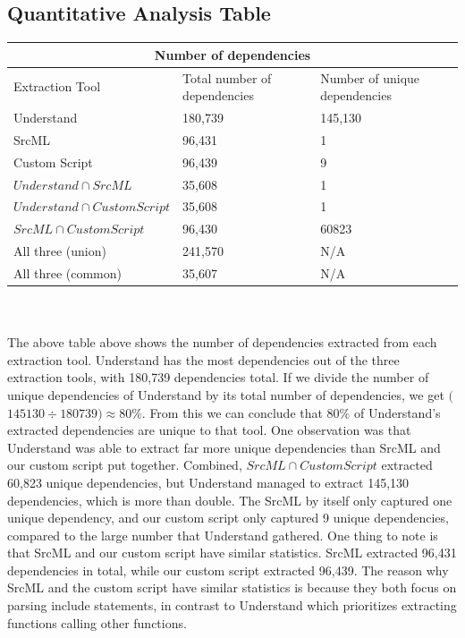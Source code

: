 \documentclass[12pt, dvipsnames, a4paper]{article}
\begin{document}
\subsection{Quantitative Analysis Table}
\begin{tabular}{ |p{6cm}||p{6cm}|p{5cm}|  }
	\hline
	\multicolumn{3}{|c|}{Number of dependencies}                                                    \\
	\hline
	Extraction Tool                  & Total number of dependencies & Number of unique dependencies \\
	\hline
	Understand                       & 180,739                      & 145,130                       \\
	SrcML                            & 96,431                       & 1                             \\
	Custom Script                    & 96,439                       & 9                             \\
	$Understand \cap  SrcML$         & 35,608                       & 1                             \\
	$Understand \cap  Custom Script$ & 35,608                       & 1                             \\
	$SrcML \cap Custom Script$       & 96,430                       & 60823                         \\
	All three (union)                & 241,570                      & N/A                           \\
	All three (common)               & 35,607                       & N/A                           \\
	\hline
\end{tabular}
\newline
\newline
\\
\\
The above table above shows the number of dependencies extracted from each extraction tool. Understand has the most dependencies out of the three extraction tools, with 180,739 dependencies total. If we divide the number of unique dependencies of Understand by its total number of dependencies, we get $($$145130 \div 180739$$) \approx 80\%$. From this we can conclude that 80\% of Understand's extracted dependencies are unique to that tool.
		\newline
		One observation was that Understand was able to extract far more unique dependencies than SrcML and our custom script put together. Combined, $SrcML \cap Custom Script$ extracted 60,823 unique dependencies, but Understand managed to extract 145,130 dependencies, which is more than double. The SrcML by itself only captured one unique dependency, and our custom script only captured 9 unique dependencies, compared to the large number that Understand gathered.
		\newline
		One thing to note is that SrcML and our custom script have similar statistics. SrcML extracted 96,431 dependencies in total, while our custom script extracted 96,439. The reason why SrcML and the custom script have similar statistics is because they both focus on parsing include statements, in contrast to Understand which prioritizes extracting functions calling other functions.
\end{document}
